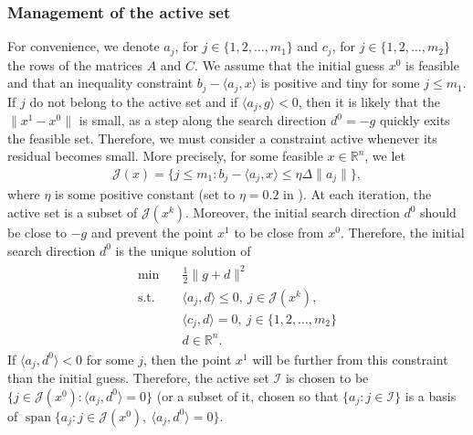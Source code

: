 \documentclass[letterpaper,10pt,english]{sphinxmanual}
\DeclareMathOperator{\vspan}{span}
\newcommand{\norm}[2][]{#1\lVert#2#1\rVert}
\newcommand{\set}[2][]{#1\{#2#1\}}
\newcommand{\inner}[2][]{#1\langle#2#1\rangle}
\def\R{\ensuremath{\mathds{R}}}
\begin{document}
\subsubsection{Management of the active set}
\label{\detokenize{algo/linalg.lctcg:management-of-the-active-set}}
\sphinxAtStartPar
For convenience, we denote
\(a_j\), for \(j \in \set{1, 2, \dots, m_1}\) and
\(c_j\), for \(j \in \set{1, 2, \dots, m_2}\) the rows of the matrices
\(A\) and \(C\). We assume that the initial guess \(x^0\) is
feasible and that an inequality constraint \(b_j - \inner{a_j, x}\) is
positive and tiny for some \(j \le m_1\). If \(j\) do not belong to the
active set and if \(\inner{a_j, g} < 0\), then it is likely that the
\(\norm{x^1 - x^0}\) is small, as a step along the search direction
\(d^0 = -g\) quickly exits the feasible set. Therefore, we must consider a
constraint active whenever its residual becomes small. More precisely, for some
feasible \(x \in \R^n\), we let
\begin{equation*}
\begin{split}\mathcal{J}(x) = \set[\big]{j \le m_1 : b_j - \inner{a_j, x} \le \eta \Delta \norm{a_j}},\end{split}
\end{equation*}
\sphinxAtStartPar
where \(\eta\) is some positive constant
(set to \(\eta = 0.2\) in ). At each iteration, the active set is a
subset of \(\mathcal{J}(x^k)\). Moreover, the initial search direction
\(d^0\) should be close to \(-g\) and prevent the point \(x^1\) to
be close from \(x^0\). Therefore, the initial search direction \(d^0\)
is the unique solution of
\begin{equation*}
\begin{split}\begin{array}{ll}
    \min        & \quad \frac{1}{2} \norm{g + d}^2\\
    \text{s.t.} & \quad \inner{a_j, d} \le 0, ~ j \in \mathcal{J}(x^k),\\
                & \quad \inner{c_j, d} = 0, ~ j \in \set{1, 2, \dots, m_2}\\
                & \quad d \in \R^n.
\end{array}\end{split}
\end{equation*}
\sphinxAtStartPar
If \(\inner{a_j, d^0} < 0\) for some \(j\), then the point \(x^1\)
will be further from this constraint than the initial guess. Therefore, the
active set \(\mathcal{I}\) is chosen to be
\(\set{j \in \mathcal{J}(x^0) : \inner{a_j, d^0} = 0}\) (or a subset of it,
chosen so that \(\set{a_j : j \in \mathcal{I}}\) is a basis of
\(\vspan \set{a_j : j \in \mathcal{J}(x^0), ~ \inner{a_j, d^0} = 0}\).
\end{document}
